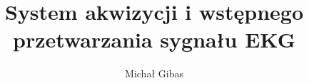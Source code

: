\documentclass[inzynier,druk]{dyplom}
\author{Michał Gibas}
\title{System akwizycji i wstępnego przetwarzania sygnału EKG}
\begin{document}
\maketitle



\tableofcontents















\nocite{*}





\listoffigures
\listoflistings
\listoftables
\end{document}
